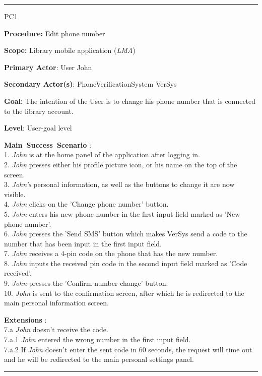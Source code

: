 \vspace{0.5cm}
\hrule
\begin{lyxlist}{PC1}
\small{
\item [\textbf{Procedure:}] Edit phone number
\item [\textbf{Scope:}] Library mobile application (\emph{LMA})
\item [\textbf{Primary Actor}:] User John
\item [\textbf{Secondary Actor(s)}:] PhoneVerificationSystem VerSys
\item [\textbf{Goal:}] The intention of the User is to change his phone number
that is connected to the library account.
\item [\textbf{Level}:] User-goal level
\item [\textbf{Main~Success~Scenario}]:\\
1. \emph{John} is at the home panel of the application after logging in.\\
2. \emph{John} presses either his profile picture icon, or his name on the
top of the screen.\\
3. \emph{John's} personal information, as well as the buttons to change it are
now visible.\\
4. \emph{John} clicks on the 'Change phone number' button.\\
5. \emph{John} enters his new phone number in the first input field marked as
'New phone number'. \\
6. \emph{John} presses the 'Send SMS' button which makes VerSys send a code to
the number that has been input in the first input field.
\\
7. \emph{John} receives a 4-pin code on the phone that has the new number. \\
8. \emph{John} inputs the received pin code in the second input field marked
as 'Code received'. \\
9. \emph{John} presses the 'Confirm number change' button. \\
10. \emph{John} is sent to the confirmation screen, after which he is redirected
to the main personal information screen. \\

\item [\textbf{Extensions}]:\\
7.a \emph{John} doesn't receive the code. \\
\hspace*{0.5cm} 7.a.1 \emph{John} entered the wrong number in the first input
field. \\
\hspace*{0.5cm} 7.a.2 If \emph{John} doesn't enter the sent code in 60
seconds, the request will time out and he will be redirected to the main personal
settings panel. \\

}

\end{lyxlist}
\hrule



